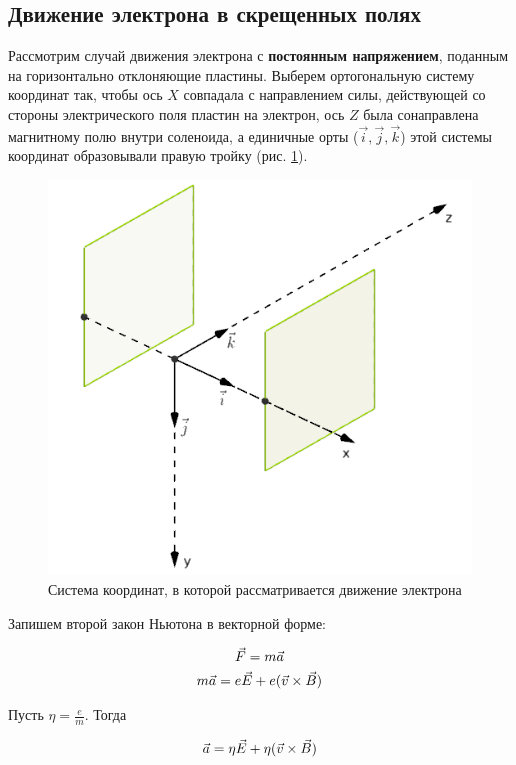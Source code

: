 \subsection{Движение электрона в скрещенных полях}

Рассмотрим случай движения электрона с \textbf{постоянным напряжением}, поданным на горизонтально отклоняющие пластины. Выберем ортогональную систему координат так, чтобы ось $X$ совпадала с направлением силы, действующей со стороны электрического поля пластин на электрон, ось $Z$ была сонаправлена магнитному полю внутри соленоида, а единичные орты ($\vec{i},\vec{j},\vec{k}$) этой системы координат образовывали правую тройку (рис. \ref{fig:axes}).

\begin{figure}[ht!]
	\centering
	\includegraphics[scale=0.5]{img/axes.png}
	\caption{Система координат, в которой рассматривается движение электрона}
	\label{fig:axes}
\end{figure}

Запишем второй закон Ньютона в векторной форме:

\begin{gather}
	\vec{F}=m\vec{a}\\
	m\vec{a}=e\vec{E}+e(\vec{v}\times\vec{B})
\end{gather}

Пусть $\eta=\frac{e}{m}$. Тогда

\begin{gather}
	\vec{a}=\eta\vec{E}+\eta(\vec{v}\times\vec{B})
\end{gather}

